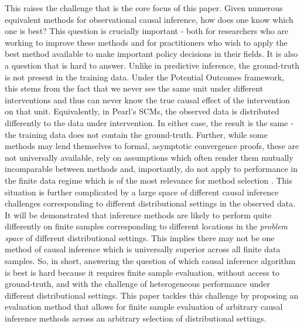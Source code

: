 \documentclass[../main.tex]{subfiles}
\begin{document}
\vspace{\baselineskip}
This raises the challenge that is the core focus of this paper. Given numerous equivalent methods for observational causal inference, how does one know which one is best? This question is crucially important - both for researchers who are working to improve these methods and for practitioners who wish to apply the best method available to make important policy decisions in their fields. It is also a question that is hard to answer. Unlike in predictive inference, the ground-truth is not present in the training data. Under the Potential Outcomes framework, this stems from the fact that we never see the same unit under different interventions and thus can never know the true causal effect of the intervention on that unit. Equivalently, in Pearl’s SCMs, the observed data is distributed differently to the data under intervention. In either case, the result is the same - the training data does not contain the ground-truth. Further, while some methods may lend themselves to formal, asymptotic convergence proofs, these are not universally available, rely on assumptions which often render them mutually incomparable between methods and, importantly, do not apply to performance in the finite data regime which is of the most relevance for method selection \cite{Knaus2018MachineEvidence}. This situation is further complicated by a large space of different causal inference challenges corresponding to different distributional settings in the observed data. It will be demonstrated that inference methods are likely to perform quite differently on finite samples corresponding to different locations in the \textit{problem space }of different distributional settings. This implies there may not be one method of causal inference which is universally superior across all finite data samples. So, in short, answering the question of which causal inference algorithm is best is hard because it requires finite sample evaluation, without access to ground-truth, and with the challenge of heterogeneous performance under different distributional settings. This paper tackles this challenge by proposing an evaluation method that allows for finite sample evaluation of arbitrary causal inference methods across an arbitrary selection of distributional settings.\par
\end{document}
